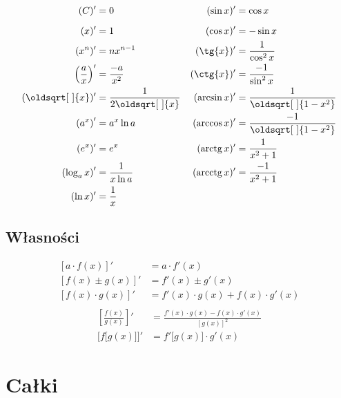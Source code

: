 \documentclass[10pt, twoside, fleqn]{article}
\renewcommand*{\sqrt}[2][\ ]{\oldsqrt[#1]{#2}}
\DeclareMathOperator{\arctg}{arctg}
\DeclareMathOperator{\arcctg}{arcctg}
\begin{document}
	\begin{align*}
		(C)' 		&= 0					&	(\sin{x})' 				&= \cos{x}					\\[0.6em]
		(x)' 		&= 1					&	(\cos{x})' 				&= -\sin{x}					\\
		(x^n)' 		&= n x^{n-1}			&	(\tg{x})' 				&= \frac{1}{\cos^2{x}}		\\
		\left( \frac{a}{x} \right)'
					&= \frac{-a}{x^2}		&	(\ctg{x})' 				&= \frac{-1}{\sin^2{x}}		\\
		(\sqrt{x})' &= \frac{1}{2\sqrt{x}} 	& 	(\arcsin{x})' 			&= \frac{1}{\sqrt{1-x^2}}	\\
		\left( a^x \right)' 		
					&= a^x \ln{a} 			&	(\arccos{x})'			&=\frac{-1}{\sqrt{1-x^2}}	\\
		(e^x)' 		&= e^x					&	(\arctg{x})'			&= \frac{1}{x^2+1}			\\
		\left( \log_a{x} \right)' 	
					&= \frac{1}{x\ln{a}}	&	(\arcctg{x})'			&=\frac{-1}{x^2+1}			\\	
		(\ln{x})' 	&= \frac{1}{x}			&	 			&					\\
	\end{align*}



\subsection{Własności}

		\begin{multicols}{2}
		\noindent
			\begin{align*}
				\left[ a \cdot f(x) \right]'  & = a \cdot f'(x)		\\[0.5em]
				\left[ f(x) \pm g(x) \right]' & = f'(x) \pm g'(x) 	\\[0.5em]
				\left[ f(x) \cdot g(x) \right]' 
					& = f'(x) \cdot g(x) + f(x) \cdot g'(x)			\\[0.5em]	
			\end{align*}
			\begin{align*}
				\left[ \frac{f(x)}{g(x)} \right]' & = 
					\frac{f'(x) \cdot g(x) - f(x) \cdot g'(x)}{[g(x)]^2} \\[0.7em]
				\Big[ f \big[ g(x) \big] \Big]'  & = 
						f'\big[ g(x) \big] \cdot g'(x)		
			\end{align*}		
		\end{multicols}



		\newpage
			\section{Całki}
\end{document}
